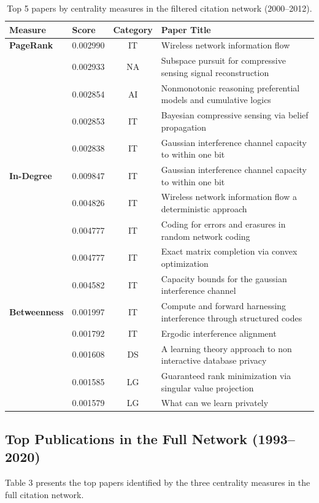 \documentclass[11pt,a4paper]{article}
\begin{document}
\begin{table}[H]
\centering
\caption{Top 5 papers by centrality measures in the filtered citation network (2000--2012).}
\label{tab:centrality_filtered}
\begin{tabular}{llcp{8.5cm}}
\toprule
\textbf{Measure} & \textbf{Score} & \textbf{Category} & \textbf{Paper Title} \\
\midrule
\textbf{PageRank} 
 & 0.002990 & IT & Wireless network information flow \\
 & 0.002933 & NA & Subspace pursuit for compressive sensing signal reconstruction \\
 & 0.002854 & AI & Nonmonotonic reasoning preferential models and cumulative logics \\
 & 0.002853 & IT & Bayesian compressive sensing via belief propagation \\
 & 0.002838 & IT & Gaussian interference channel capacity to within one bit \\
\midrule
\textbf{In-Degree} 
 & 0.009847 & IT & Gaussian interference channel capacity to within one bit \\
 & 0.004826 & IT & Wireless network information flow a deterministic approach \\
 & 0.004777 & IT & Coding for errors and erasures in random network coding \\
 & 0.004777 & IT & Exact matrix completion via convex optimization \\
 & 0.004582 & IT & Capacity bounds for the gaussian interference channel \\
\midrule
\textbf{Betweenness} 
 & 0.001997 & IT & Compute and forward harnessing interference through structured codes \\
 & 0.001792 & IT & Ergodic interference alignment \\
 & 0.001608 & DS & A learning theory approach to non interactive database privacy \\
 & 0.001585 & LG & Guaranteed rank minimization via singular value projection \\
 & 0.001579 & LG & What can we learn privately \\
\bottomrule
\end{tabular}
\end{table}

\subsection{Top Publications in the Full Network (1993--2020)}
Table 3 presents the top papers identified by the three centrality measures in the full citation network.
\end{document}
